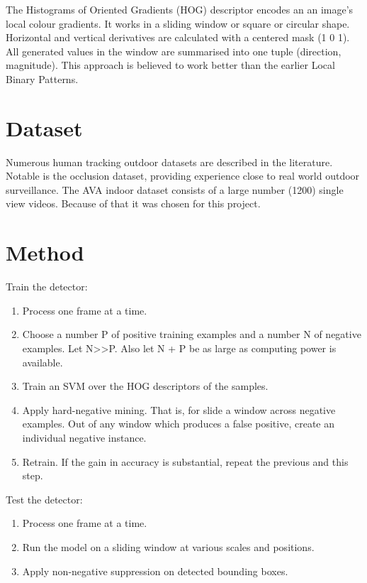 \documentclass{article}
\begin{document}
The Histograms of Oriented Gradients (HOG)\cite{hog} descriptor encodes an an image's local colour gradients.
It works in a sliding window or square or circular shape.
Horizontal and vertical derivatives are calculated with a centered mask (1 0 1).
All generated values in the window are summarised into one tuple (direction, magnitude).
This approach is believed to work better than the earlier Local Binary Patterns.


\section{Dataset}
Numerous human tracking outdoor datasets are described in the literature\cite{datasets0}\cite{datasets1}.
Notable is the occlusion dataset\cite{datasets2}, providing experience close to real world outdoor surveillance.
The AVA indoor dataset\cite{ava} consists of a large number (1200) single view videos.
Because of that it was chosen for this project.



\section{Method}
Train the detector:
\begin{enumerate}
\item{Process one frame at a time.}
\item{Choose a number P of positive training examples and a number N of negative examples. Let N>>P. Also let N + P be as large as computing power is available.}
\item{Train an SVM over the HOG descriptors of the samples.}
\item{Apply hard-negative mining. That is, for slide a window across negative examples. Out of any window which produces a false positive, create an individual negative instance.}
\item{Retrain. If the gain in accuracy is substantial, repeat the previous and this step.}
\end{enumerate}

Test the detector:
\begin{enumerate}
\item{Process one frame at a time.}
\item{Run the model on a sliding window at various scales and positions.}
\item{Apply non-negative suppression on detected bounding boxes.}
\end{enumerate}
\end{document}
